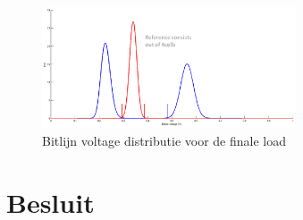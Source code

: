 \begin{figure}[!ht]
  \centering
  \includegraphics[width=0.67\textwidth]{../fig/hfdst-last-var2.png}
  \caption{Bitlijn voltage distributie voor de finale load}
  \label{fig:distswitch}
\end{figure}

\section{Besluit}